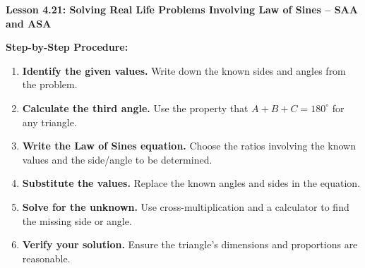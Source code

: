 \begin{center}
\textbf{Lesson 4.21: Solving Real Life Problems Involving Law of Sines -- SAA and ASA}
\end{center}

\vspace*{-1.5ex}

\noindent\textbf{Step-by-Step Procedure:}
\begin{enumerate}
    \item \textbf{Identify the given values.} Write down the known sides and angles from the problem.
    \item \textbf{Calculate the third angle.} Use the property that \(A + B + C = 180^\circ\) for any triangle.
    \item \textbf{Write the Law of Sines equation.} Choose the ratios involving the known values and the side/angle to be determined.
    \item \textbf{Substitute the values.} Replace the known angles and sides in the equation.
    \item \textbf{Solve for the unknown.} Use cross-multiplication and a calculator to find the missing side or angle.
    \item \textbf{Verify your solution.} Ensure the triangle's dimensions and proportions are reasonable.
\end{enumerate}
